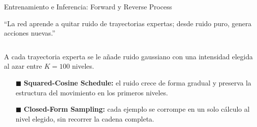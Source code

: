 \documentclass[aspectratio=169,10pt,xcolor={dvipsnames,table}]{beamer}
\newcommand{\BannerFont}{\fontsize{7.5}{9.2}\selectfont\bfseries}       %
\newcommand{\CardTitleFont}{\fontsize{7.5}{9}\selectfont\bfseries}      %
\newcommand{\BodyFont}{\fontsize{6.2}{7.8}\selectfont}                  %
\newcommand{\CardArc}{2pt}                 %
\newcommand{\CardRule}{0.6pt}              %
\newcommand{\BannerArc}{1.5pt}             %
\newcommand{\BannerRule}{0.5pt}            %
\newcommand{\BannerLeftRule}{2.5pt}        %
\newcommand{\CardHeightDouble}{42.5mm}     %
\newcommand{\BannerCentral}[2][UCNCyan]{%
  \begin{tcolorbox}[
    enhanced,
    colback=#1!10,
    colframe=#1,
    boxrule=\BannerRule,
    leftrule=\BannerLeftRule,
    arc=\BannerArc,
    top=0.35mm, bottom=0.35mm, left=2mm, right=2mm
  ]
    {\BannerFont\raggedright\textcolor{UCNBlue}{#2}\par}
  \end{tcolorbox}%
  \vspace{-2.5mm}%
}
\newcommand{\BannerRef}[1]{{\mdseries\fontsize{5}{6}\selectfont\textcolor{TextDark!65}{\cite{#1}}}} %
\begin{document}
\begin{frame}{Entrenamiento e Inferencia: Forward y Reverse Process}
  \BannerCentral[UCNBlue]{``La red aprende a quitar ruido de trayectorias expertas; desde ruido puro, genera acciones nuevas.'' \BannerRef{song2021sde,yang2024survey}}
  \vspace{0.8mm}
  \begin{columns}[T, onlytextwidth]
    \begin{column}{0.485\textwidth}
      \begin{tcolorbox}[
        enhanced,
        colback=WhiteBg,
        colframe=UCNBlue,
        arc=\CardArc,
        boxrule=\CardRule,
        height=\CardHeightDouble,
        title={\CardTitleFont Forward Process (Gaussian Diffusion)},
        colbacktitle=UCNBlue,
        coltitle=WhiteBg,
        top=1.0mm, bottom=1.0mm, left=1.6mm, right=1.6mm
      ]
        {\BodyFont
        A cada trayectoria experta se le añade ruido gaussiano con una intensidad elegida al azar entre $K = 100$ niveles.
        \vspace{0.6mm}
        \begin{itemize}\setlength{\itemsep}{0.8pt}
          \item[\textcolor{UCNBlue}{$\blacksquare$}] \textbf{Squared-Cosine Schedule:} el ruido crece de forma gradual y preserva la estructura del movimiento en los primeros niveles.
          \item[\textcolor{UCNBlue}{$\blacksquare$}] \textbf{Closed-Form Sampling:} cada ejemplo se corrompe en un solo cálculo al nivel elegido, sin recorrer la cadena completa.
        \end{itemize}}
      \end{tcolorbox}
    \end{column}


\end{columns}
\end{frame}
\end{document}

